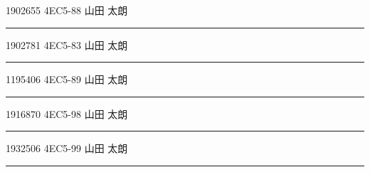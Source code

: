 \documentclass[a4paper,twocolumn,dvipdfmx,uplatex]{utarticle}
\begin{document}
\hspace{1cm}1902655 4EC5-88 山田 太朗\vspace{1mm}%
\vspace{0.6cm}
\hrule\par\vspace{1mm}
\hspace{1cm}1902781 4EC5-83 山田 太朗\vspace{1mm} %
\vspace{0.6cm}
\hrule\par\vspace{1mm}
\hspace{1cm}1195406 4EC5-89 山田 太朗\vspace{1mm} %
\vspace{0.6cm}
\hrule\par\vspace{1mm}
\hspace{1cm}1916870 4EC5-98 山田 太朗\vspace{1mm} %
\vspace{0.6cm}
\hrule\par\vspace{1mm}
\hspace{1cm}1932506 4EC5-99 山田 太朗\vspace{1mm} %
\vspace{0.6cm}
\hrule
\end{document}
